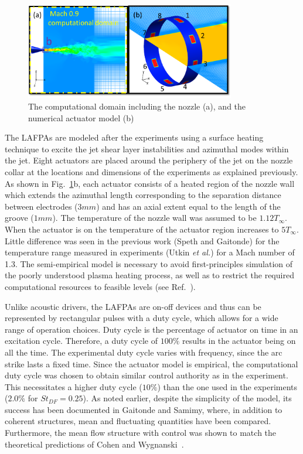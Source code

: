 \documentclass[english]{aiaa-tc}
\begin{document}
\begin{figure}[h]
\begin{center}
\includegraphics[width=3.6in]{actuatormodelnew}
\caption{The computational domain including the nozzle  (a), and the numerical actuator model (b)}\label{fig:actuator}
\end{center}
\end{figure}
The LAFPAs are modeled after the experiments using a surface heating
technique to excite the jet shear layer instabilities and azimuthal modes
within the jet.  Eight actuators are placed around the periphery of
the jet on the nozzle collar at the locations and dimensions of the
experiments as explained previously. As shown in
Fig.~\ref{fig:actuator}b, each actuator consists of a heated region of
the nozzle wall which extends the azimuthal length corresponding to
the separation distance between electrodes ($3 mm$) and has an axial
extent equal to the length of the groove ($1 mm$). The temperature of
the nozzle wall was assumed to be $1.12T_{\infty}$.  When the actuator
is on the temperature of the actuator region increases to
$5T_{\infty}$. Little difference was seen in the previous work (Speth
and Gaitonde\cite{SpethASM2012}) for the temperature range measured in
experiments (Utkin {\em et al.}\cite{uyg2007-2}) for a Mach number of
1.3.  The semi-empirical model is necessary to avoid first-principles
simulation of the poorly understood plasma heating process, as well as
to restrict the required computational resources to feasible levels
(see Ref.~).

Unlike acoustic drivers, the LAFPAs are on-off devices and thus can be
represented by rectangular pulses with a duty cycle, which allows for
a wide range of operation choices.  Duty cycle is the percentage of
actuator on time in an excitation cycle. Therefore, a duty cycle
of $100\%$ results in the actuator being on all the time.
The experimental duty cycle varies with frequency, since the arc
strike lasts a fixed time.  Since the actuator
model is empirical, the computational duty cycle was chosen to obtain
similar control authority as in the experiment.  This necessitates a
higher
duty cycle ($10\%$) than the one used in the experiments
($2.0\%$ for $St_{DF}=0.25$).
As noted earlier, despite the simplicity of the model, its success
has been documented in Gaitonde
and Samimy\cite{gdv2011-POF}, where, in addition to coherent
structures, mean and fluctuating quantities have been compared.
Furthermore, the mean flow structure with control was shown to match
the theoretical predictions of Cohen and Wygnanski~\cite{cj87-2}.
\end{document}
